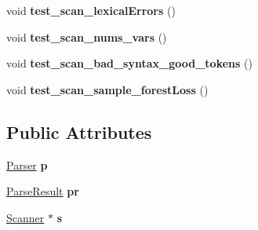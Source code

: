 \begin{DoxyCompactItemize}
\item 
\hypertarget{classScannerTestSuite_af85168e66ba2b924488aca9768231367}{void {\bfseries test\-\_\-scan\-\_\-lexical\-Errors} ()}\label{classScannerTestSuite_af85168e66ba2b924488aca9768231367}

\item 
\hypertarget{classScannerTestSuite_a4bd4d5fc2218f3d28b08b2821ecc271b}{void {\bfseries test\-\_\-scan\-\_\-nums\-\_\-vars} ()}\label{classScannerTestSuite_a4bd4d5fc2218f3d28b08b2821ecc271b}

\item 
\hypertarget{classScannerTestSuite_aad7648d262ef3c103f0792ef73aa3bd8}{void {\bfseries test\-\_\-scan\-\_\-bad\-\_\-syntax\-\_\-good\-\_\-tokens} ()}\label{classScannerTestSuite_aad7648d262ef3c103f0792ef73aa3bd8}

\item 
\hypertarget{classScannerTestSuite_a8248f8bda6c9909971ef13f1364ab8f8}{void {\bfseries test\-\_\-scan\-\_\-sample\-\_\-forest\-Loss} ()}\label{classScannerTestSuite_a8248f8bda6c9909971ef13f1364ab8f8}

\end{DoxyCompactItemize}
\subsection*{Public Attributes}
\begin{DoxyCompactItemize}
\item 
\hypertarget{classScannerTestSuite_acd6ab329cae3108c0c2b9cb68f8163b9}{\hyperlink{classParser}{Parser} {\bfseries p}}\label{classScannerTestSuite_acd6ab329cae3108c0c2b9cb68f8163b9}

\item 
\hypertarget{classScannerTestSuite_a6c3059aedcf64eda4d09475fbd5d2742}{\hyperlink{classParseResult}{Parse\-Result} {\bfseries pr}}\label{classScannerTestSuite_a6c3059aedcf64eda4d09475fbd5d2742}

\item 
\hypertarget{classScannerTestSuite_a39987f3459098101d7c7fb5a4492996d}{\hyperlink{classScanner}{Scanner} $\ast$ {\bfseries s}}\label{classScannerTestSuite_a39987f3459098101d7c7fb5a4492996d}

\end{DoxyCompactItemize}


